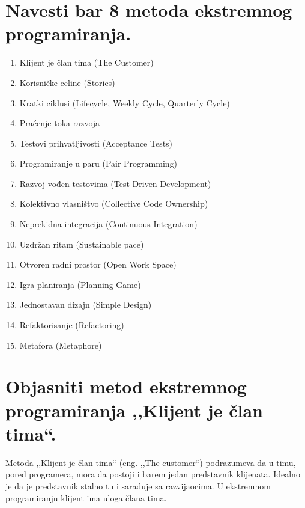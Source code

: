 \documentclass[a4paper]{article}
\begin{document}
\section{Navesti bar 8 metoda ekstremnog programiranja.}
  \begin{enumerate}
    \item Klijent je član tima (The Customer)
    \item Korisničke celine (Stories)
    \item Kratki ciklusi (Lifecycle, Weekly Cycle, Quarterly Cycle)
    \item Praćenje toka razvoja
    \item Testovi prihvatljivosti (Acceptance Tests)
    \item Programiranje u paru (Pair Programming)
    \item Razvoj vođen testovima (Test-Driven Development)
    \item Kolektivno vlasništvo (Collective Code Ownership)
    \item Neprekidna integracija (Continuous Integration)
    \item Uzdržan ritam (Sustainable pace)
    \item Otvoren radni prostor (Open Work Space)
    \item Igra planiranja (Planning Game)
    \item Jednostavan dizajn (Simple Design)
    \item Refaktorisanje (Refactoring)
    \item Metafora (Metaphore)\cite{aa_xp}\cite{ab_xp}
  \end{enumerate}

\section{Objasniti metod ekstremnog programiranja ,,Klijent je član tima``.}
  Metoda ,,Klijent je član tima`` (eng. ,,The customer``) podrazumeva da u timu,
  pored programera, mora da postoji i barem jedan predstavnik klijenata. Idealno je
  da je predstavnik stalno tu i sarađuje sa razvijaocima. U ekstremnom programiranju
  klijent ima uloga člana tima. 
\end{document}
